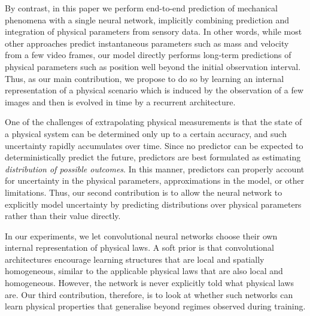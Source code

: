 

By contrast, in this paper we perform end-to-end prediction of mechanical phenomena with a single neural network, implicitly combining prediction and integration of physical parameters from sensory data. In other words, while most other approaches predict instantaneous parameters such as mass and velocity from a few video frames, our model directly performs long-term predictions of physical parameters such as position well beyond the initial observation interval. Thus, as our main contribution, we propose to do so by learning an internal representation of a physical scenario which is induced by the observation of a few images and then is evolved in time by a recurrent architecture.


One of the challenges of extrapolating physical measurements is that the state of a physical system can be determined only up to a certain accuracy, and such uncertainty rapidly accumulates over time. Since no predictor can be expected to deterministically predict the future, predictors are best formulated as estimating \emph{distribution of possible outcomes}. In this manner, predictors can properly account for uncertainty in the physical parameters, approximations in the model, or other limitations. Thus, our second contribution is to allow the neural network to explicitly model uncertainty by predicting distributions over physical parameters rather than their value directly.

In our experiments, we let convolutional neural networks choose their own internal representation of physical laws. A soft prior is that convolutional architectures encourage learning structures that are local and spatially homogeneous, similar to the applicable physical laws that are also local and homogeneous. However, the network is never explicitly told what physical laws are. Our third contribution, therefore, is to look at whether such networks can learn physical properties that generalise beyond regimes observed during training.

